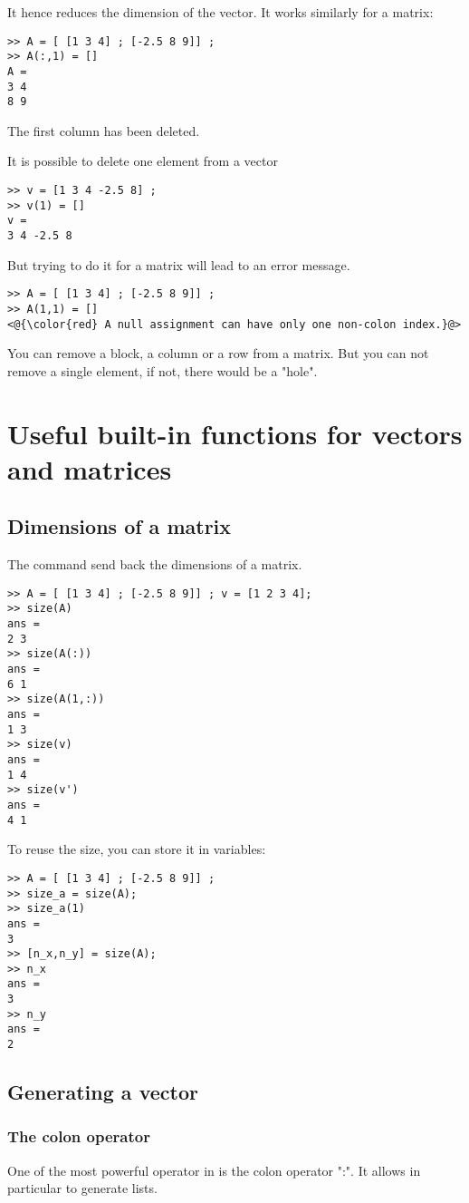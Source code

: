 It hence reduces the dimension of the vector. It works similarly for a matrix:
\begin{lstlisting}
>> A = [ [1 3 4] ; [-2.5 8 9]] ;
>> A(:,1) = []
A = 
3 4
8 9
\end{lstlisting}
The first column has been deleted.


It is possible to delete one element from a vector 

\begin{lstlisting}
>> v = [1 3 4 -2.5 8] ;
>> v(1) = []
v = 
3 4 -2.5 8
\end{lstlisting}

But trying to do it for a matrix will lead to an error message.
\begin{lstlisting}
>> A = [ [1 3 4] ; [-2.5 8 9]] ;
>> A(1,1) = []
<@{\color{red} A null assignment can have only one non-colon index.}@>
\end{lstlisting}

You can remove a block, a column or a row from a matrix. 
But you can not remove a single element, if not, there would be a "hole".


\section{Useful built-in functions for vectors and matrices}
\subsection{Dimensions of a matrix}
The command  send back the dimensions of a matrix.
\begin{lstlisting}
>> A = [ [1 3 4] ; [-2.5 8 9]] ; v = [1 2 3 4];
>> size(A)
ans = 
2 3
>> size(A(:))
ans =
6 1
>> size(A(1,:))
ans =
1 3
>> size(v)
ans = 
1 4
>> size(v')
ans = 
4 1
\end{lstlisting}
To reuse the size, you can store it in variables:
\begin{lstlisting}
>> A = [ [1 3 4] ; [-2.5 8 9]] ; 
>> size_a = size(A);
>> size_a(1)
ans =
3
>> [n_x,n_y] = size(A);
>> n_x
ans = 
3
>> n_y
ans = 
2
\end{lstlisting}


\subsection{Generating a vector}

\subsubsection{The colon operator}
\label{sssec-colon}
One of the most powerful operator in \matlab is the colon operator ":".
It allows in particular to generate lists.

